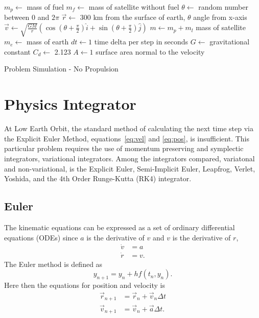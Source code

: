 \begin{algorithm}
	\SetAlgoLined
	\DontPrintSemicolon
	$m_p\leftarrow$ mass of fuel\;
	$m_f\leftarrow$ mass of satellite without fuel\;
	$\theta\leftarrow$ random number between $0$ and $2\pi$\;
	$\vec{r}\leftarrow$ 300 km from the surface of earth, $\theta$ angle from x-axis\;
	$\vec{v}\leftarrow \sqrt{\frac{GM}{r}}(\cos(\theta+\frac{\pi}{2})\hat{i}+\sin(\theta+\frac{\pi}{2})\hat{j})$ \;
	$m\leftarrow m_p+m_l$ mass of satellite \;
	$m_e\leftarrow$ mass of earth \;
	$dt\leftarrow 1$ time delta per step in seconds \;
	$G\leftarrow$ gravitational constant \;
	$C_d\leftarrow$ 2.123 \;
	$A\leftarrow1$ surface area normal to the velocity\;
	\caption{Problem Simulation - No Propulsion}\label{alg:problemsim}
\end{algorithm}

\section{Physics Integrator}

At Low Earth Orbit, the standard method of calculating the next time step via the Explicit Euler Method, equations~\ref{eq:vel} and \ref{eq:pos}, is insufficient. This particular problem requires the use of momentum preserving and symplectic integrators, variational integrators. Among the integrators compared, variatonal and non-variational, is the Explicit Euler, Semi-Implicit Euler, Leapfrog, Verlet, Yoshida, and the 4th Order Runge-Kutta (RK4) integrator.

\subsection{Euler}
The kinematic equations can be expressed as a set of ordinary differential equations (ODEs) since $a$ is the derivative of $v$ and $v$ is the derivative of $r$,
\begin{align*}
\dot{v}&=a\\
\dot{r}&=v.
\end{align*} The Euler method is defined as $$y_{n+1}=y_n+hf(t_n, y_n).$$ Here then the equations for position and velocity is 
\begin{align*}
\vec{r}_{n+1}&=\vec{r}_n+\vec{v}_n \Delta t\\
\vec{v}_{n+1}&=\vec{v}_n+\vec{a} \Delta t.
\end{align*}

